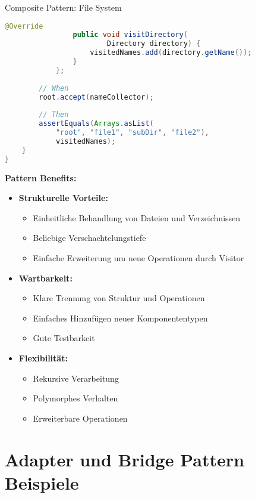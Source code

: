 \begin{example2}{Composite Pattern: File System}
\begin{lstlisting}[language=Java, style=basesmol]
                @Override
                public void visitDirectory(
                        Directory directory) {
                    visitedNames.add(directory.getName());
                }
            };
            
        // When
        root.accept(nameCollector);
        
        // Then
        assertEquals(Arrays.asList(
            "root", "file1", "subDir", "file2"), 
            visitedNames);
    }
}
\end{lstlisting}

\textbf{Pattern Benefits:}
\begin{itemize}
    \item \textbf{Strukturelle Vorteile:}
    \begin{itemize}
        \item Einheitliche Behandlung von Dateien und Verzeichnissen
        \item Beliebige Verschachtelungstiefe
        \item Einfache Erweiterung um neue Operationen durch Visitor
    \end{itemize}
    
    \item \textbf{Wartbarkeit:}
    \begin{itemize}
        \item Klare Trennung von Struktur und Operationen
        \item Einfaches Hinzufügen neuer Komponententypen
        \item Gute Testbarkeit
    \end{itemize}
    
    \item \textbf{Flexibilität:}
    \begin{itemize}
        \item Rekursive Verarbeitung
        \item Polymorphes Verhalten
        \item Erweiterbare Operationen
    \end{itemize}
\end{itemize}
\end{example2}

\section{Adapter und Bridge Pattern Beispiele}

